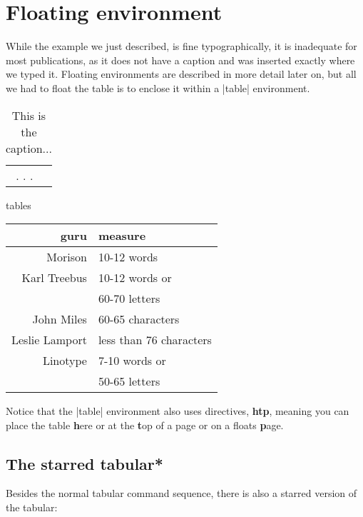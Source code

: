 \section{Floating environment} 

While the example we just described, is fine typographically, it is inadequate for most publications, as it does not have a caption and was inserted exactly where we typed it. Floating environments are described in more detail later on, but all we had to float the table is to enclose it within a |table| environment.

\begin{teXXX}
\begin{table}[htp]
\begin{tabular}{rl}
.
.
.
\end{tabular}
\caption{This is the caption...}
\end{table}
\end{teXXX}

\begin{texexample}{tables}{}
\centering
\begin{tabular}{rl}
\toprule
  guru                  & measure \\
\midrule
  Morison             & 10-12 words \\
  Karl Treebus      & 10-12 words or\\
                          & 60-70 letters \\
  John Miles         & 60-65 characters \\
  Leslie Lamport   & less than 76 characters \\
  Linotype            & 7-10 words or\\
                         & 50-65 letters\\
\bottomrule
\end{tabular}
\end{texexample}


Notice that the |table| environment also uses directives, \textbf{htp}, meaning you can place the table \textbf{h}ere or at the \textbf{t}op of a page or on a floats \textbf{p}age.

\clearpage


\subsection{The starred tabular*}

Besides the normal tabular command sequence, there is also a 
starred version of the tabular:

